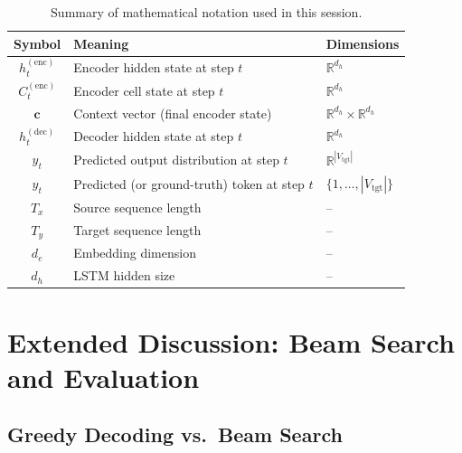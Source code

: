 \documentclass[12pt,a4paper]{article}
\begin{document}
\begin{table}[htbp]
  \centering
  \caption{Summary of mathematical notation used in this session.}
  \label{tab:notation}
  \begin{tabular}{@{}cll@{}}
    \toprule
    \textbf{Symbol} & \textbf{Meaning} & \textbf{Dimensions} \\
    \midrule
    $h_t^{(\text{enc})}$ & Encoder hidden state at step $t$ & $\mathbb{R}^{d_h}$ \\
    $C_t^{(\text{enc})}$ & Encoder cell state at step $t$ & $\mathbb{R}^{d_h}$ \\
    $\mathbf{c}$         & Context vector (final encoder state) & $\mathbb{R}^{d_h} \times \mathbb{R}^{d_h}$ \\
    $h_t^{(\text{dec})}$ & Decoder hidden state at step $t$ & $\mathbb{R}^{d_h}$ \\
    $\hat{y}_t$          & Predicted output distribution at step $t$ & $\mathbb{R}^{|V_{\text{tgt}}|}$ \\
    $y_t$                & Predicted (or ground-truth) token at step $t$ & $\{1, \ldots, |V_{\text{tgt}}|\}$ \\
    $T_x$                & Source sequence length & -- \\
    $T_y$                & Target sequence length & -- \\
    $d_e$                & Embedding dimension & -- \\
    $d_h$                & LSTM hidden size & -- \\
    \bottomrule
  \end{tabular}
\end{table}

\section{Extended Discussion: Beam Search and Evaluation}
\label{sec:beam_search}

\subsection{Greedy Decoding vs.\ Beam Search}
\end{document}
